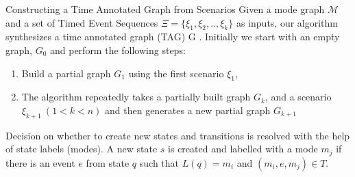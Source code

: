 \documentclass[10pt]{beamer}
\theoremstyle{plain}
\theoremstyle{definition}
\begin{document}
\begin{frame}{Constructing a Time Annotated Graph from Scenarios}
	Given a mode graph $\mathcal{M}$ and a set of Timed Event Sequences  $\Xi = \{\xi_1,\xi_2,..,\xi_k\}$ as inputs, our algorithm synthesizes a time annotated graph (TAG) G \cite{FromScenariosToTimedAutomata-2016}. Initially we start with an empty graph, $G_0$ and perform the following steps:
	\begin{enumerate}
		\item Build a partial graph $G_1$ using the first scenario $\xi_1$,
		\item The algorithm repeatedly takes a partially built graph $G_k$, and a scenario $\xi_{k+1} ~(1 < k < n)$ and then generates a new partial graph $G_{k+1}$
	\end{enumerate}
	Decision on whether to create new states and transitions is resolved with the help of state labels (modes).
	A new state $s$ is created and labelled with a mode $m_j$ if there is an event $e$ from state $q$ such that $L(q) = m_i$ and $(m_i,e,m_j) \in T$.
\end{frame}
\end{document}
